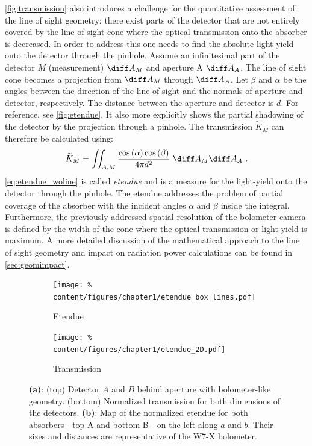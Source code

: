 %
            \autoref{fig:transmission} also introduces a challenge for the quantitative assessment of the line of sight geometry: there exist parts of the detector that are not entirely covered by the line of sight cone where the optical transmission onto the absorber is decreased. In order to address this one needs to find the absolute light yield onto the detector through the pinhole. Assume an infinitesimal part of the detector $M$ (measurement) $\diff A_{M}$ and aperture A $\diff A_{A}$. The line of sight cone becomes a projection from $\diff A_{M}$ through $\diff A_{A}$. Let $\beta$ and $\alpha$ be the angles between the direction of the line of sight and the normals of aperture and detector, respectively. The distance between the aperture and detector is $d$. For reference, see \cref{fig:etendue}. It also more explicitly shows the partial shadowing of the detector by the projection through a pinhole. The transmission $\widetilde{K}_{M}$ can therefore be calculated using:%
%
            \begin{align}%
                \widetilde{K}_{M}=\iint_{A, M}\frac{\cos\left(\alpha\right)\cos\left(\beta\right)}{4\pi d^{2}}\,\,\diff A_{M}\diff A_{A}\,\,.\label{eq:etendue_woline}%
            \end{align}%
%
            \autoref{eq:etendue_woline} is called \textit{etendue} and is a measure for the light-yield onto the detector through the pinhole. The etendue addresses the problem of partial coverage of the absorber with the incident angles $\alpha$ and $\beta$ inside the integral. Furthermore, the previously addressed spatial resolution of the bolometer camera is defined by the width of the cone where the optical transmission or light yield is maximum. A more detailed discussion of the mathematical approach to the line of sight geometry and impact on radiation power calculations can be found in \cref{sec:geomimpact}.\\%
%
            \begin{figure}[t]%
                \centering%
                \begin{subfigure}{0.4\textwidth}%
                    \texttt{[image: \%
                        content/figures/chapter1/etendue\_box\_lines.pdf]}%
                    \caption{Etendue}\label{fig:etendue_box}%
                \end{subfigure}%
                \hspace*{1.0cm}%
                \begin{subfigure}{0.5\textwidth}%
                    \texttt{[image: \%
                        content/figures/chapter1/etendue\_2D.pdf]}%
                    \caption{Transmission}\label{fig:trans_map}%
                \end{subfigure}%
                \caption{\textbf{(a)}: (top) Detector $A$ and $B$ behind aperture with bolometer-like geometry. (bottom) Normalized transmission for both dimensions of the detectors. \textbf{(b)}: Map of the normalized etendue for both absorbers - top A and bottom B - on the left along $a$ and $b$. Their sizes and distances are representative of the W7-X bolometer.}\label{fig:etendue_transmission}%
            \end{figure}
